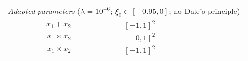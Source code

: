 \begin{table}
\begin{tabular}{r r r r r r r }
& \cellcolor{White!40!SteelBlue}{$8.1 \%$}

& \cellcolor{White!80!SteelBlue}{$6.7 \%$}

& \cellcolor{White!100!SteelBlue}{$\mathbf{6.4 \%}$}

& \cellcolor{White!60!SteelBlue}{$7.3 \%$}

\\

\midrule

\multicolumn{7}{c}{\textit{Adapted parameters} ($\lambda = 10^{-6}$; $\xi_0 \in [-0.95, 0]$; no Dale's principle)} \\

\midrule

$x_1 + x_2$

& $[-1, 1]^2$

& \cellcolor{White!100!SteelBlue}{$\mathbf{4.0 \%}$}

& \cellcolor{White!60!SteelBlue}{$7.1 \%$}

& \cellcolor{White!100!SteelBlue}{$\mathbf{4.0 \%}$}

& \cellcolor{White!40!SteelBlue}{$20.3 \%$}

& \cellcolor{White!20!SteelBlue}{$22.8 \%$}

\\

$x_1 \times x_2$

& $[0, 1]^2$

& \cellcolor{White!20!SteelBlue}{$21.3 \%$}

& \cellcolor{White!80!SteelBlue}{$9.0 \%$}

& \cellcolor{White!100!SteelBlue}{$\mathbf{4.6 \%}$}

& \cellcolor{White!60!SteelBlue}{$9.3 \%$}

& \cellcolor{White!40!SteelBlue}{$9.8 \%$}

\\

$x_1 \times x_2$

& $[-1, 1]^2$

& \cellcolor{White!20!SteelBlue}{$99.1 \%$}

& \cellcolor{White!100!SteelBlue}{$\mathbf{10.3 \%}$}

& \cellcolor{White!40!SteelBlue}{$65.0 \%$}

& \cellcolor{White!80!SteelBlue}{$14.7 \%$}

& \cellcolor{White!60!SteelBlue}{$14.9 \%$}

\\

\bottomrule

\end{tabular}


\end{table}
